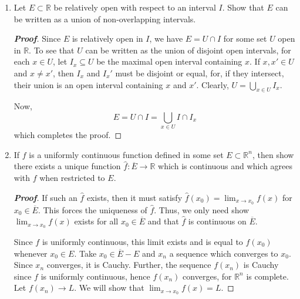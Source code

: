 \documentclass[12pt,leqno]{book}
\theoremstyle{definition}
\newenvironment{Proof}{\begin{proof}[\textnormal{\textbf{Proof}}]}{\end{proof}}
\begin{document}
\begin{enumerate}
\begin{Proof}
We now show the second result, namely that $\int_a^bf_k(x)dx\to\int_a^bf(x)dx$. Since $f_k\to f$ uniformly, for $\epsilon>0$ we can choose $N$ so that $|f_n(x)-f(x)|<\frac{\epsilon}{b-a}$ for all $n\geq N$ and $x\in(a,b)$. Thus, for $\epsilon>0$: \begin{align*}\left|\int_a^bf_n(x)dx-\int_a^bf(x)dx\right|&=\left|\int_a^bf_n(x)-f(x)dx\right|\\&\leq\int_a^b\left|f_n(x)-f(x)\right|dx\\&<\int_a^b\frac{\epsilon}{b-a}dx\\&=\epsilon\qedhere\end{align*}
\end{Proof}

\item Let $E\subset\mathbb{R}$ be relatively open with respect to an interval $I$. Show that $E$ can be written as a union of non-overlapping intervals. 

\begin{Proof}
 Since $E$ is relatively open in $I$, we have $E=U\cap I$ for some set $U$ open in $\mathbb{R}$. To see that $U$ can be written as the union of disjoint open intervals, for each $x\in U$, let $I_x\subseteq U$ be the maximal open interval containing $x$. If $x, x'\in U$ and $x\not=x'$, then $I_x$ and $I_x'$ must be disjoint or equal, for, if they intersect, their union is an open interval containing $x$ and $x'$. Clearly, $U=\bigcup_{x\in U}I_x$. 

Now, \[E=U\cap I=\bigcup_{x\in U}I\cap I_x\] which completes the proof.  
\end{Proof}


\item If $f$ is a uniformly continuous function defined in some set $E\subset\mathbb{R}^n$, then show there exists a unique function $\hat{f}:\overline{E}\to\mathbb{R}$ which is continuous and which agrees with $f$ when restricted to $E$.

\begin{Proof}
If such an $\hat{f}$ exists, then it must satisfy $\hat{f}(x_0)=\lim_{x\to x_0}f(x)$ for $x_0\in\overline{E}$. This forces the uniqueness of $\hat{f}$. Thus, we only need show $\lim_{x\to x_0}f(x)$ exists for all $x_0\in\overline{E}$ and that $\hat{f}$ is continuous on $\overline{E}$.

Since $f$ is uniformly continuous, this limit exists and is equal to $f(x_0)$ whenever $x_0\in E$. Take $x_0\in\overline{E}-E$ and $x_n$ a sequence which converges to $x_0$. Since $x_n$ converges, it is Cauchy. Further, the sequence $f(x_n)$ is Cauchy since $f$ is uniformly continuous, hence $f(x_n)$ converges, for $\mathbb{R}^n$ is complete. Let $f(x_n)\to L$. We will show that $\lim_{x\to x_0}f(x)=L$. 


\end{Proof}
\end{enumerate}
\end{document}
